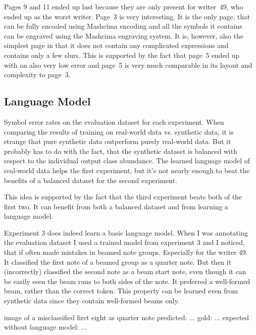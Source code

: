 Pages 9 and 11 ended up last because they are only present for writer~49, who ended up as the worst writer. Page~3 is very interesting. It is the only page, that can be fully encoded using Mashcima encoding and all the symbols it contains can be engraved using the Mashcima engraving system. It is, however, also the simplest page in that it does not contain any complicated expressions and contains only a few slurs. This is supported by the fact that page~5 ended up with an also very low error and page~5 is very much comparable in its layout and complexity to page~3.

\newpage


\subsection{Language Model}
\label{sec:LanguageModel}

Symbol error rates on the evaluation dataset for each experiment. When comparing the results of training on real-world data vs. synthetic data, it is strange that pure synthetic data outperform purely real-world data. But it probably has to do with the fact, that the synthetic dataset is balanced with respect to the individual output class abundance. The learned language model of real-world data helps the first experiment, but it's not nearly enough to beat the benefits of a balanced dataset for the second experiment.

This idea is supported by the fact that the third experiment beats both of the first two. It can benefit from both a balanced dataset and from learning a language model.

Experiment 3 does indeed learn a basic language model. When I was annotating the evaluation dataset I used a trained model from experiment 3 and I noticed, that if often made mistakes in beamed note groups. Especially for the writer 49. It classified the first note of a beamed group as a quarter note. But then it (incorrectly) classified the second note as a beam start note, even though it can be easily seen the beam runs to both sides of the note. It preferred a well-formed beam, rather than the correct token. This property can be learned even from synthetic data since they contain well-formed beams only.

\begin{code}
image of a misclassified first eight as quarter note
predicted: ...
gold: ...
expected without language model: ...
\end{code}

